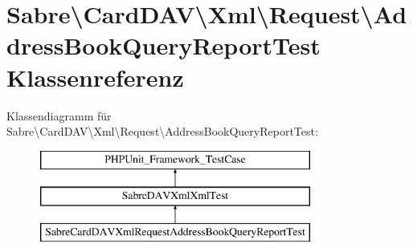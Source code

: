\hypertarget{class_sabre_1_1_card_d_a_v_1_1_xml_1_1_request_1_1_address_book_query_report_test}{}\section{Sabre\textbackslash{}Card\+D\+AV\textbackslash{}Xml\textbackslash{}Request\textbackslash{}Address\+Book\+Query\+Report\+Test Klassenreferenz}
\label{class_sabre_1_1_card_d_a_v_1_1_xml_1_1_request_1_1_address_book_query_report_test}
Klassendiagramm für Sabre\textbackslash{}Card\+D\+AV\textbackslash{}Xml\textbackslash{}Request\textbackslash{}Address\+Book\+Query\+Report\+Test\+:\begin{figure}[H]
\begin{center}
\leavevmode
\includegraphics[height=3.000000cm]{class_sabre_1_1_card_d_a_v_1_1_xml_1_1_request_1_1_address_book_query_report_test}
\end{center}
\end{figure}
